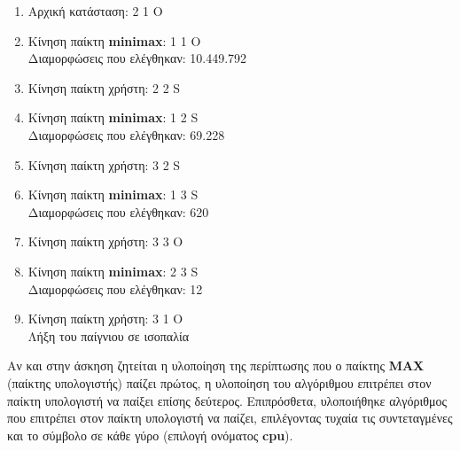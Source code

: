 \documentclass{article}
\begin{document}
\begin{enumerate}\addtocounter{enumi}{-1}
	\centering
    \item Αρχική κατάσταση: 2 1 O
    \item Κίνηση παίκτη \textbf{minimax}: 1 1 O\\ Διαμορφώσεις που ελέγθηκαν: 10.449.792 
    \item Κίνηση παίκτη χρήστη: 2 2 S
    \item Κίνηση παίκτη \textbf{minimax}: 1 2 S\\ Διαμορφώσεις που ελέγθηκαν: 69.228
    \item Κίνηση παίκτη χρήστη: 3 2 S
    \item Κίνηση παίκτη \textbf{minimax}: 1 3 S\\ Διαμορφώσεις που ελέγθηκαν: 620 
    \item Κίνηση παίκτη χρήστη: 3 3 O
    \item Κίνηση παίκτη \textbf{minimax}: 2 3 S\\ Διαμορφώσεις που ελέγθηκαν: 12
    \item Κίνηση παίκτη χρήστη: 3 1 O\\Λήξη του παίγνιου σε ισοπαλία
\end{enumerate}
Αν και στην άσκηση ζητείται η υλοποίηση της περίπτωσης που ο παίκτης \textbf{MAX} (παίκτης υπολογιστής) παίζει 
πρώτος, η υλοποίηση του αλγόριθμου επιτρέπει στον παίκτη υπολογιστή να παίξει επίσης δεύτερος. Επιπρόσθετα,
υλοποιήθηκε αλγόριθμος που επιτρέπει στον παίκτη υπολογιστή να παίζει, επιλέγοντας τυχαία τις συντεταγμένες και το σύμβολο σε κάθε γύρο (επιλογή ονόματος \textbf{cpu}).
\end{document}

